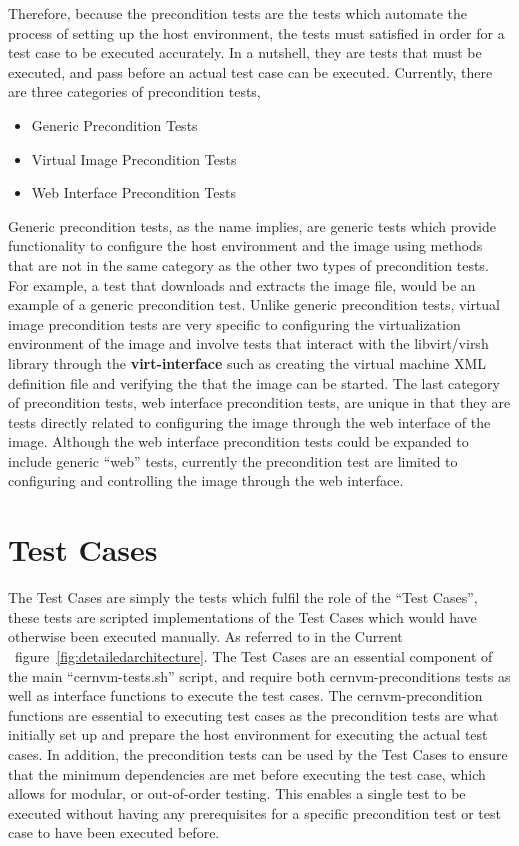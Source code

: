 Therefore, because the precondition tests are the tests which automate the process of setting up the host environment, the tests must
satisfied in order for a \cernvm test case to be executed accurately. In a nutshell, they are tests that must be executed, and pass before an 
actual test case can be executed. Currently, there are three categories of precondition tests, 

\begin{itemize}
\item	Generic Precondition Tests
\item	Virtual Image Precondition Tests
\item	Web Interface Precondition Tests
\end{itemize}

Generic precondition tests, as the name implies, are generic tests which provide functionality to configure the host environment and the
\cernvm image using methods that are not in the same category as the other two types of precondition tests. For example, a test that 
downloads and extracts the \cernvm image file, would be an example of a generic precondition test. Unlike generic precondition tests, 
virtual image precondition tests are very specific to configuring the virtualization environment of the \cernvm image and involve tests 
that interact with the libvirt/virsh library through the {\bf virt-interface} such as creating the virtual machine XML definition file 
and verifying the that the \cernvm image can be started. The last category of precondition tests, web interface precondition tests, 
are unique in that they are tests directly related to configuring the \cernvm image through the web interface of the \cernvm image. 
Although the web interface precondition tests could be expanded to include generic ``web'' tests, currently the precondition test are 
limited to configuring and controlling the \cernvm image through the web interface.




\section{\cernvm Test Cases}
\label{sec:cernvmtestcases}

The \cernvm Test Cases are simply the tests which fulfil the role of the ``\cernvm Test Cases'', these tests are scripted
implementations of the \cernvm Test Cases which would have otherwise been executed manually. As referred to in the
Current \cernvmtestframework\ figure~\ref{fig:detailedarchitecture}. The \cernvm Test Cases are an essential component
of the main ``cernvm-tests.sh'' script, and require both cernvm-preconditions tests as well as interface functions
to execute the test cases. The cernvm-precondition functions are essential to executing test cases as the precondition tests
are what initially set up and prepare the host environment for executing the actual test cases. In addition, the precondition
tests can be used by the \cernvm Test Cases to ensure that the minimum dependencies are met before executing the test case,
which allows for modular, or out-of-order testing. This enables a single test to be executed without having any prerequisites
for a specific precondition test or test case to have been executed before.

